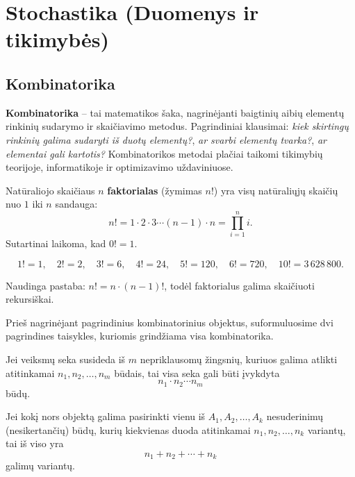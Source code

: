 \chapter{Stochastika (Duomenys ir tikimybės)}

\section{Kombinatorika}

\textbf{Kombinatorika} -- tai matematikos šaka, nagrinėjanti baigtinių aibių elementų rinkinių sudarymo ir skaičiavimo metodus. Pagrindiniai klausimai: \emph{kiek skirtingų rinkinių galima sudaryti iš duotų elementų?}, \emph{ar svarbi elementų tvarka?}, \emph{ar elementai gali kartotis?} Kombinatorikos metodai plačiai taikomi tikimybių teorijoje, informatikoje ir optimizavimo uždaviniuose.

\begin{definition}[Faktorialas]
Natūraliojo skaičiaus $n$ \textbf{faktorialas} (žymimas $n!$) yra visų natūraliųjų skaičių nuo $1$ iki $n$ sandauga:
\[
n! = 1 \cdot 2 \cdot 3 \cdots (n-1) \cdot n = \prod_{i=1}^{n} i.
\]
Sutartinai laikoma, kad $0! = 1$.
\end{definition}

\begin{example}
\[
1! = 1, \quad 2! = 2, \quad 3! = 6, \quad 4! = 24, \quad 5! = 120, \quad 6! = 720, \quad 10! = 3\,628\,800.
\]
\end{example}

\begin{remark}
Naudinga pastaba: $n! = n \cdot (n-1)!$, todėl faktorialus galima skaičiuoti rekursiškai.
\end{remark}

Prieš nagrinėjant pagrindinius kombinatorinius objektus, suformuluosime dvi pagrindines taisykles, kuriomis grindžiama visa kombinatorika.

\begin{theorem}
Jei veiksmų seka susideda iš $m$ nepriklausomų žingsnių, kuriuos galima atlikti atitinkamai $n_1, n_2, \ldots, n_m$ būdais, tai visa seka gali būti įvykdyta
\[
n_1 \cdot n_2 \cdots n_m
\]
būdų.
\end{theorem}

\begin{theorem}
Jei kokį nors objektą galima pasirinkti vienu iš $A_1, A_2, \ldots, A_k$ nesuderinimų (nesikertančių) būdų, kurių kiekvienas duoda atitinkamai $n_1, n_2, \ldots, n_k$ variantų, tai iš viso yra
\[
n_1 + n_2 + \cdots + n_k
\]
galimų variantų.
\end{theorem}

